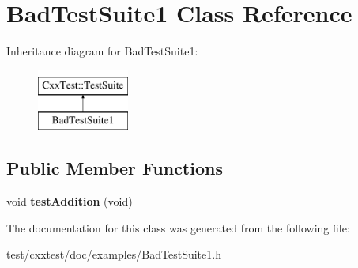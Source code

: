 \hypertarget{classBadTestSuite1}{\section{Bad\-Test\-Suite1 Class Reference}
\label{classBadTestSuite1}
}
Inheritance diagram for Bad\-Test\-Suite1\-:\begin{figure}[H]
\begin{center}
\leavevmode
\includegraphics[height=2.000000cm]{classBadTestSuite1}
\end{center}
\end{figure}
\subsection*{Public Member Functions}
\begin{DoxyCompactItemize}
\item 
\hypertarget{classBadTestSuite1_a35526fe8f2f3b0cec303ce2b71d714c1}{void {\bfseries test\-Addition} (void)}\label{classBadTestSuite1_a35526fe8f2f3b0cec303ce2b71d714c1}

\end{DoxyCompactItemize}


The documentation for this class was generated from the following file\-:\begin{DoxyCompactItemize}
\item 
test/cxxtest/doc/examples/Bad\-Test\-Suite1.\-h\end{DoxyCompactItemize}

